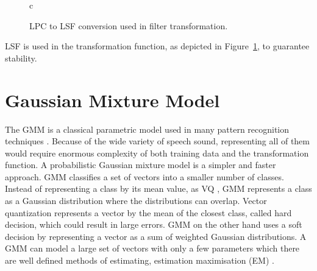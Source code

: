 \begin{figure}[htbp]
	\centering
	\begin{tabular}[h]{c}
	\end{tabular}
	\caption{LPC to LSF conversion used in filter transformation.}
	\label{fig:lpc_to_lsf}
\end{figure}
LSF is used in the transformation function, as depicted in Figure~\ref{fig:lpc_to_lsf}, to guarantee stability.



\section{Gaussian Mixture Model} %
\label{sec:gaussian_mixture_model}
The GMM is a classical parametric model used in many pattern recognition techniques \cite{stylianou98}. Because of the wide variety of speech sound, representing all of them would require enormous complexity of both training data and the transformation function. A probabilistic Gaussian mixture model is a simpler and faster approach. GMM classifies a set of vectors into a smaller number of classes. Instead of representing a class by its mean value, as VQ , GMM represents a class as a Gaussian distribution where the distributions can overlap. Vector quantization represents a vector by the mean of the closest class, called hard decision, which could result in large errors. GMM on the other hand uses a soft decision by representing a vector as a sum of weighted Gaussian distributions. A GMM can model a large set of vectors with only a few parameters which there are well defined methods of estimating, \eg estimation maximisation (EM) \cite{taletek}.

